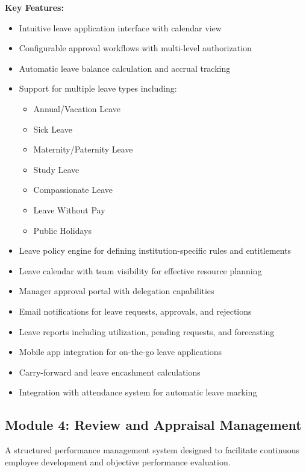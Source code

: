\documentclass[12pt]{article}
\begin{document}
\textbf{Key Features:}
\begin{itemize}[noitemsep]
\item Intuitive leave application interface with calendar view
\item Configurable approval workflows with multi-level authorization
\item Automatic leave balance calculation and accrual tracking
\item Support for multiple leave types including:
  \begin{itemize}
  \item Annual/Vacation Leave
  \item Sick Leave
  \item Maternity/Paternity Leave
  \item Study Leave
  \item Compassionate Leave
  \item Leave Without Pay
  \item Public Holidays
  \end{itemize}
\item Leave policy engine for defining institution-specific rules and entitlements
\item Leave calendar with team visibility for effective resource planning
\item Manager approval portal with delegation capabilities
\item Email notifications for leave requests, approvals, and rejections
\item Leave reports including utilization, pending requests, and forecasting
\item Mobile app integration for on-the-go leave applications
\item Carry-forward and leave encashment calculations
\item Integration with attendance system for automatic leave marking
\end{itemize}

\subsection{Module 4: Review and Appraisal Management}

A structured performance management system designed to facilitate continuous employee development and objective performance evaluation.
\end{document}
